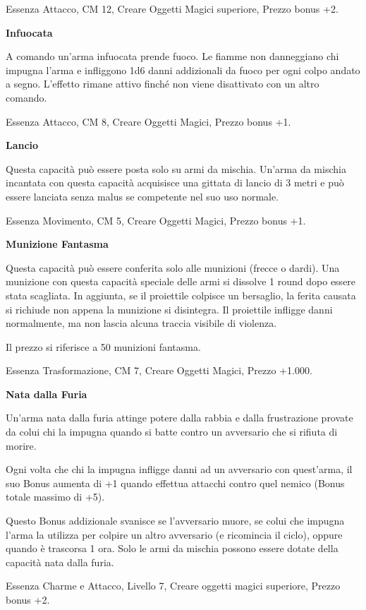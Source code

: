 \documentclass[a4paper,11pt,twoside,openany]{book}
\begin{document}
{Essenza Attacco, CM 12, Creare Oggetti Magici superiore, Prezzo bonus +2.

\textbf{Infuocata}

A comando un'arma infuocata prende fuoco. Le fiamme non danneggiano chi impugna l'arma e infliggono 1d6 danni addizionali da fuoco per ogni colpo andato a segno. L'effetto rimane attivo finché non viene disattivato con un altro comando.

Essenza Attacco, CM 8, Creare Oggetti Magici, Prezzo bonus +1.

\textbf{Lancio}

Questa capacità può essere posta solo su armi da mischia. Un'arma da mischia incantata con questa capacità acquisisce una gittata di lancio di 3 metri e può essere lanciata senza malus se competente nel suo uso normale.

Essenza Movimento, CM 5, Creare Oggetti Magici, Prezzo bonus +1.

\textbf{Munizione Fantasma}

Questa capacità può essere conferita solo alle munizioni (frecce o dardi). Una munizione con questa capacità speciale delle armi si dissolve 1 round dopo essere stata scagliata. In aggiunta, se il proiettile colpisce un bersaglio, la ferita causata si richiude non appena la munizione si disintegra. Il proiettile infligge danni normalmente, ma non lascia alcuna traccia visibile di violenza.

Il prezzo si riferisce a 50 munizioni fantasma.

Essenza Trasformazione, CM 7, Creare Oggetti Magici, Prezzo +1.000.

\textbf{Nata dalla Furia}

Un'arma nata dalla furia attinge potere dalla rabbia e dalla frustrazione provate da colui chi la impugna quando si batte contro un avversario che si rifiuta di morire.

Ogni volta che chi la impugna infligge danni ad un avversario con quest'arma, il suo Bonus aumenta di +1 quando effettua attacchi contro quel nemico (Bonus totale massimo di +5).

Questo Bonus addizionale svanisce se l'avversario muore, se colui che impugna l'arma la utilizza per colpire un altro avversario (e ricomincia il ciclo), oppure quando è trascorsa 1 ora. Solo le armi da mischia possono essere dotate della capacità nata dalla furia.

Essenza Charme e Attacco, Livello 7, Creare oggetti magici superiore, Prezzo bonus +2.

}
\end{document}

